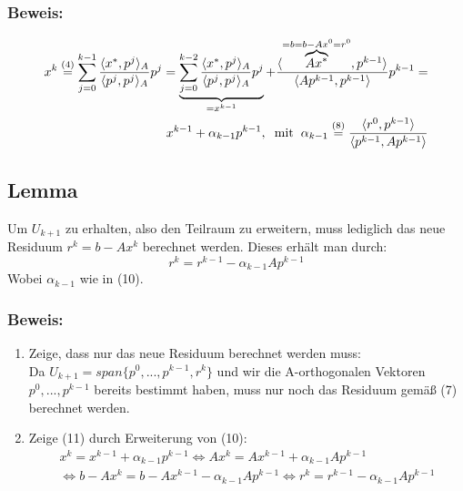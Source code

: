 \documentclass{article}
\begin{document}
\subsubsection{Beweis:}
\begin{align*}
\begin{split}
x^{k} \overset{(4)}{=}
\sum_{j=0}^{k-1} \frac {\langle x^{*}, p^{j} \rangle _{A}} {\langle {p^{j}, p^{j}} \rangle _{A}} p^{j} =
\underbrace{\sum_{j=0}^{k-2} \frac {\langle x^{*}, p^{j} \rangle _{A}} {\langle {p^{j}, p^{j}} \rangle _{A}} p^{j}}_{=x^{k-1}} +
\frac {\langle \overbrace{Ax^{*}}^{=b=b-Ax^{0}=r^{0}}, p^{k-1} \rangle} {\langle {Ap^{k-1}, p^{k-1}} \rangle} p^{k-1} =\\
x^{k-1} + \alpha_{k-1}p^{k-1}, \hspace{2mm} \textnormal{mit} \hspace{2mm} \alpha_{k-1} \overset{(8)}{=} \frac {\langle r^{0}, p^{k-1} \rangle} {\langle {p^{k-1}, Ap^{k-1}} \rangle}
\end{split}
\end{align*}

\subsection{Lemma}
Um $U_{k+1}$ zu erhalten, also den Teilraum zu erweitern, muss lediglich das neue Residuum $r^{k} = b - Ax^{k}$ berechnet werden. Dieses erhält man durch:
\begin{equation}
r^{k} = r^{k-1} - \alpha_{k-1}Ap^{k-1}
\end{equation}
Wobei $\alpha_{k-1}$ wie in (10).

\subsubsection{Beweis:}
\begin{enumerate}
\item Zeige, dass nur das neue Residuum berechnet werden muss:
\\Da $U_{k+1} = span\{p^{0},...,p^{k-1},r^{k}\}$ und wir die A-orthogonalen Vektoren $p^{0},...,p^{k-1}$ bereits bestimmt haben, muss nur noch das Residuum gemäß (7) berechnet werden.
\item Zeige (11) durch Erweiterung von (10):
\begin{equation*}
\begin{split}
x^{k} = x^{k-1} + \alpha_{k-1}p^{k-1}
\Longleftrightarrow Ax^{k} = Ax^{k-1} + \alpha_{k-1}Ap^{k-1}\\
\Longleftrightarrow b - Ax^{k} = b - Ax^{k-1} - \alpha_{k-1}Ap^{k-1}
\Longleftrightarrow r^{k} = r^{k-1} - \alpha_{k-1}Ap^{k-1}
\end{split}
\end{equation*}
\end{enumerate}
\end{document}
